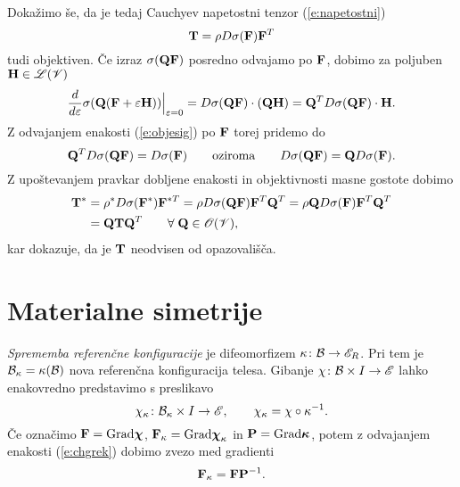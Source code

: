 Dokažimo še, da je tedaj Cauchyev napetostni tenzor (\ref{e:napetostni})
\begin{equation} \label{e:Tdrugi}
	\mathbf T=\rho D\sigma(\mathbf F)\mathbf F^T
\end{equation}
tudi objektiven. Če izraz $\sigma(\mathbf Q\mathbf F)$ posredno odvajamo po $\mathbf F$,
dobimo za poljuben $\mathbf H\in\mathscr L(\mathscr V)$
\[
	\frac{d}{d\varepsilon}\sigma(\mathbf Q(\mathbf F+\varepsilon\mathbf H))\Big|_{\varepsilon=0}
	=D\sigma(\mathbf Q\mathbf F)\cdot(\mathbf Q\mathbf H)=\mathbf Q^T D\sigma(\mathbf Q\mathbf F)\cdot\mathbf H.
\]
Z odvajanjem enakosti (\ref{e:objesig}) po $\mathbf F$ torej pridemo do
\[
	\mathbf Q^T D\sigma(\mathbf Q\mathbf F) = D\sigma(\mathbf F)\qquad\textrm{oziroma}
	\qquad D\sigma(\mathbf Q\mathbf F) = \mathbf QD\sigma(\mathbf F).
\]
Z upoštevanjem pravkar dobljene enakosti in objektivnosti masne gostote dobimo
\begin{align*}
	\mathbf T^*&=\rho^* D\sigma(\mathbf F^*)\mathbf F^{*T}
	=\rho D\sigma(\mathbf Q\mathbf F)\mathbf F^{T}\mathbf Q^{T}
	=\rho \mathbf Q D\sigma(\mathbf F)\mathbf F^{T}\mathbf Q^{T} \nonumber \\
	&=\mathbf Q\mathbf T\mathbf Q^{T}\qquad\forall\;\mathbf Q\in\mathscr{O}(\mathscr V),
\end{align*}
kar dokazuje, da je $\mathbf T$ neodvisen od opazovališča.


\section{Materialne simetrije}


\emph{Sprememba referenčne konfiguracije} je difeomorfizem $\kappa\colon\mathcal B\to\mathscr E_R$.
Pri tem je $\mathcal B_{\kappa}=\kappa(\mathcal B)$ nova referenčna konfiguracija telesa. Gibanje
$\chi\colon\mathcal B\times I\to\mathscr E$ lahko enakovredno predstavimo s preslikavo
\begin{equation} \label{e:chgrek}
	\chi_{\kappa}\colon\mathcal B_{\kappa}\times I\to\mathscr E, \qquad
	\chi_{\kappa}=\chi\circ\kappa^{-1}.
\end{equation}
Če označimo $\mathbf F=\mathrm{Grad}\boldsymbol \chi$, $\mathbf F_{\kappa}=\mathrm{Grad}\boldsymbol \chi_{\kappa}$
in $\mathbf P=\mathrm{Grad}\boldsymbol \kappa$, potem z odvajanjem enakosti (\ref{e:chgrek})
dobimo zvezo med gradienti
\[
	\mathbf F_{\kappa}=\mathbf F\mathbf P^{-1}.
\]

